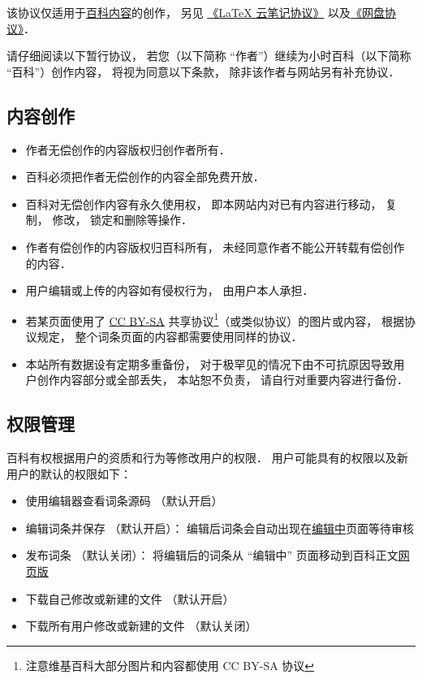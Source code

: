 
该协议仅适用于\href{http://wuli.wiki/online/}{百科内容}的创作， 另见 \href{http://wuli.wiki/online/NtLcns.html}{《LaTeX 云笔记协议》} 以及\href{http://www.example.com}{《网盘协议》}．

请仔细阅读以下暂行协议， 若您（以下简称 “作者”）继续为小时百科（以下简称 “百科”）创作内容， 将视为同意以下条款， 除非该作者与网站另有补充协议．

\subsection{内容创作}
\begin{itemize}
\item 作者无偿创作的内容版权归创作者所有．
\item 百科必须把作者无偿创作的内容全部免费开放．
\item 百科对无偿创作内容有永久使用权， 即本网站内对已有内容进行移动， 复制， 修改， 锁定和删除等操作．
\item 作者有偿创作的内容版权归百科所有， 未经同意作者不能公开转载有偿创作的内容．
\item 用户编辑或上传的内容如有侵权行为， 由用户本人承担．

\item 若某页面使用了 \href{https://creativecommons.org/licenses/by-sa/3.0/}{CC BY-SA} 共享协议\footnote{注意维基百科大部分图片和内容都使用 CC BY-SA 协议}（或类似协议）的图片或内容， 根据协议规定， 整个词条页面的内容都需要使用同样的协议．
\item 本站所有数据设有定期多重备份， 对于极罕见的情况下由不可抗原因导致用户创作内容部分或全部丢失， 本站恕不负责， 请自行对重要内容进行备份．
\end{itemize}

\subsection{权限管理}
百科有权根据用户的资质和行为等修改用户的权限． 用户可能具有的权限以及新用户的默认的权限如下：
\begin{itemize}
\item 使用编辑器查看词条源码 （默认开启）
\item 编辑词条并保存 （默认开启）： 编辑后词条会自动出现在\href{http://wuli.wiki/changed}{编辑中}页面等待审核
\item 发布词条 （默认关闭）： 将编辑后的词条从 “编辑中” 页面移动到百科正文\href{http://wuli.wiki/online}{网页版}
\item 下载自己修改或新建的文件 （默认开启）
\item 下载所有用户修改或新建的文件 （默认关闭）
\end{itemize}
